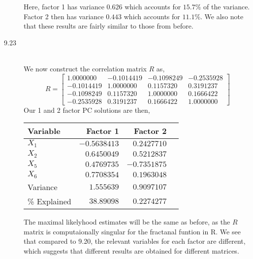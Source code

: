 \documentclass[letterpaper,10pt]{article}
\begin{document}
\begin{description}
\begin{center}
\end{center}
Here, factor 1 has variance $0.626$ which accounts for $15.7\%$ of the variance. Factor 2 then has variance $0.443$ which accounts for $11.1\%$. We also note that these results are fairly similar to those from before.
\item[9.23]\hfill\\
We now construct the correlation matrix $R$ as,
\[R=\begin{bmatrix}
1.0000000 & -0.1014419 & -0.1098249 & -0.2535928\\
-0.1014419 &  1.0000000 & 0.1157320 & 0.3191237\\
-0.1098249 & 0.1157320 & 1.0000000 & 0.1666422\\
-0.2535928 & 0.3191237 & 0.1666422 & 1.0000000
\end{bmatrix} \]
Our 1 and 2 factor PC solutions are then,
\begin{center}
\begin{tabular}{|l|r|r|r|}
\hline
Variable & Factor 1 & Factor 2 \\\hline
$X_1$ & $ -0.5638413 $ & $ 0.2427710 $ \\
$X_2$ & $ 0.6450049 $ & $ 0.5212837 $ \\
$X_5$ & $ 0.4769735 $ & $ -0.7351875 $ \\
$X_6$ & $ 0.7708354 $ & $ 0.1963048 $ \\\hline
Variance & $1.555639$ & $0.9097107$ \\
\% Explained & $ 38.89098 $ & $0.2274277$ \\\hline
\end{tabular}
\end{center}
The maximal likelyhood estimates will be the same as before, as the $R$ matrix is computaionally singular for the fractanal funtion in R.  We see that compared to 9.20, the relevant variables for each factor are different, which suggests that different results are obtained for different matrices.
\end{description}
\end{document}
